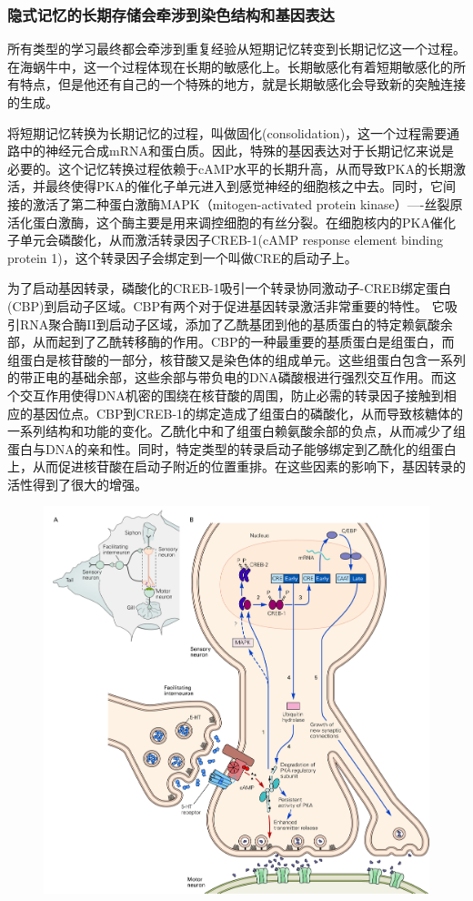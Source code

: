 \documentclass[UTF8,nofonts]{ctexart}
\begin{document}
\subsubsection{隐式记忆的长期存储会牵涉到染色结构和基因表达}
所有类型的学习最终都会牵涉到重复经验从短期记忆转变到长期记忆这一个过程。在海蜗牛中，这一个过程体现在长期的敏感化上。长期敏感化有着短期敏感化的所有特点，但是他还有自己的一个特殊的地方，就是长期敏感化会导致新的突触连接的生成。
\par
将短期记忆转换为长期记忆的过程，叫做固化(consolidation)，这一个过程需要通路中的神经元合成mRNA和蛋白质。因此，特殊的基因表达对于长期记忆来说是必要的。这个记忆转换过程依赖于cAMP水平的长期升高，从而导致PKA的长期激活，并最终使得PKA的催化子单元进入到感觉神经的细胞核之中去。同时，它间接的激活了第二种蛋白激酶MAPK（mitogen-activated protein kinase）----丝裂原活化蛋白激酶，这个酶主要是用来调控细胞的有丝分裂。在细胞核内的PKA催化子单元会磷酸化，从而激活转录因子CREB-1(cAMP response element binding protein 1)，这个转录因子会绑定到一个叫做CRE的启动子上。
\par
为了启动基因转录，磷酸化的CREB-1吸引一个转录协同激动子-CREB绑定蛋白(CBP)到启动子区域。CBP有两个对于促进基因转录激活非常重要的特性。 它吸引RNA聚合酶II到启动子区域，添加了乙酰基团到他的基质蛋白的特定赖氨酸余部，从而起到了乙酰转移酶的作用。CBP的一种最重要的基质蛋白是组蛋白，而组蛋白是核苷酸的一部分，核苷酸又是染色体的组成单元。这些组蛋白包含一系列的带正电的基础余部，这些余部与带负电的DNA磷酸根进行强烈交互作用。而这个交互作用使得DNA机密的围绕在核苷酸的周围，防止必需的转录因子接触到相应的基因位点。CBP到CREB-1的绑定造成了组蛋白的磷酸化，从而导致核糖体的一系列结构和功能的变化。乙酰化中和了组蛋白赖氨酸余部的负点，从而减少了组蛋白与DNA的亲和性。同时，特定类型的转录启动子能够绑定到乙酰化的组蛋白上，从而促进核苷酸在启动子附近的位置重排。在这些因素的影响下，基因转录的活性得到了很大的增强。
\begin{figure}
	\centering
	\includegraphics[scale=0.9]{Pic/6606_PNS5.jpg}
\end{figure}
\end{document}
